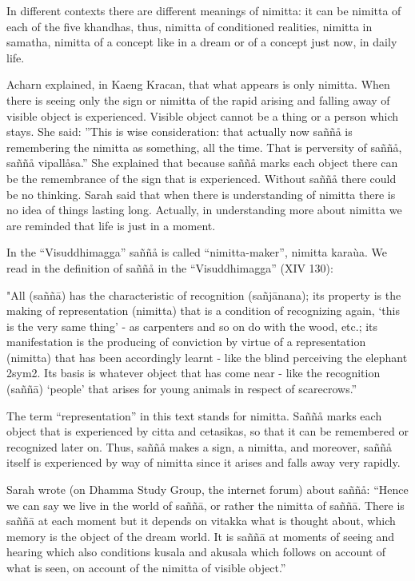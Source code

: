 \documentclass[10pt,a4paper,final]{article}
\begin{document}
In different contexts there are different meanings of
nimitta: it can be nimitta of each of the five khandhas, thus, nimitta
of conditioned realities, nimitta in samatha, nimitta of a concept like
in a dream or of a concept just now, in daily life. 

Acharn explained, in Kaeng Kracan, that what appears is only
nimitta. When there is seeing only the sign or nimitta of the rapid
arising and falling away of visible object is experienced. Visible
object cannot be a thing or a person which stays. She said: ''This is
wise consideration: that actually now saññå is remembering the nimitta
as something, all the time. That is perversity of saññå, saññå
vipallåsa.'' She explained that because saññå marks each object there
can be the remembrance of the sign that is experienced. Without saññå
there could be no thinking. Sarah said that when there is understanding
of nimitta there is no idea of things lasting long. Actually, in
understanding more about nimitta we are reminded that life is just in a
moment. 

In the ``Visuddhimagga'' saññå is called ``nimitta-maker'',
nimitta karaùa. We read in the definition of saññå in the
``Visuddhimagga'' (XIV 130):

"All
(saññā) has the
characteristic of recognition
(sañjānana); its
property is the making of representation (nimitta) that is a condition
of recognizing again, `this is the very same thing' - as carpenters and
so on do with the wood, etc.; its manifestation is the producing of
conviction by virtue of a representation (nimitta) that has been
accordingly learnt - like the blind perceiving the
elephant
\protect\hyperlinksdfootnote2sym2.
Its basis is whatever object that has come near - like the recognition
(saññā) `people' that arises
for young animals in respect of scarecrows.''

The term ``representation'' in this text
stands for nimitta. Saññå marks each object that is experienced by citta
and cetasikas, so that it can be remembered or recognized later on.
Thus, saññå makes a sign, a nimitta, and moreover, saññå itself is
experienced by way of nimitta since it arises and falls away very
rapidly. 

Sarah wrote
(on Dhamma Study Group, the internet
forum) about saññå:
``Hence we can say we live in the
world of saññā, or rather
the nimitta of saññā. There
is saññā at each moment
but it depends on vitakka what is thought about, which memory is the
object of the dream world. It is saññā
at moments of seeing and hearing
which also conditions kusala and akusala which follows on account of
what is seen, on account of the nimitta of visible
object.''
\end{document}
